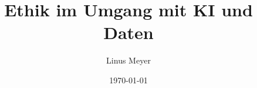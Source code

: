 \documentclass{report}
\title{Ethik im Umgang mit KI und Daten}
\author{Linus Meyer}
\date{\today}
\begin{document}
\maketitle

\tableofcontents




   
\nocite{*}
\printbibliography
\end{document}
